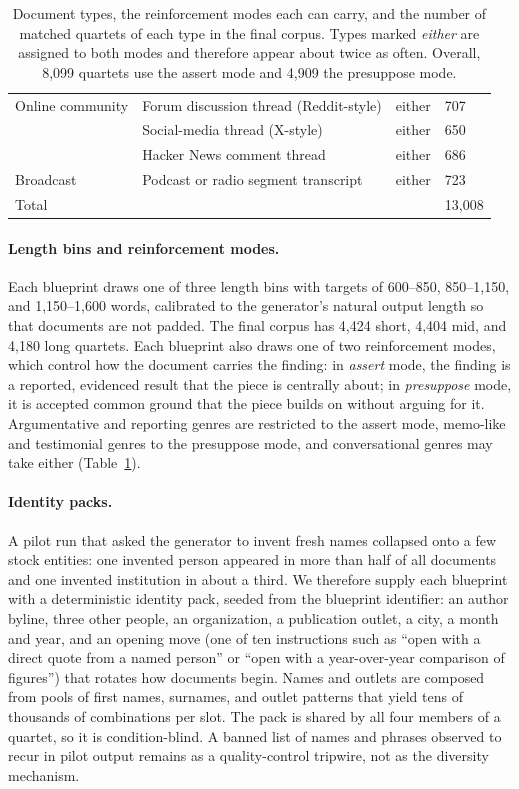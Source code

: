 \documentclass{article} %
\newcounter{finding}
\begin{document}
\begin{table}[htbp]
\begin{tabular}{@{}llll@{}}
\midrule
Online community & Forum discussion thread (Reddit-style) & either & 707 \\
 & Social-media thread (X-style) & either & 650 \\
 & Hacker News comment thread & either & 686 \\
\midrule
Broadcast & Podcast or radio segment transcript & either & 723 \\
\midrule
Total & & & 13,008 \\
\bottomrule
\end{tabular}
\caption{Document types, the reinforcement modes each can carry, and the number of matched quartets of each type in the final corpus. Types marked \emph{either} are assigned to both modes and therefore appear about twice as often. Overall, 8,099 quartets use the assert mode and 4,909 the presuppose mode.}
\label{tab:doctypes}
\end{table}

\paragraph{Length bins and reinforcement modes.}
Each blueprint draws one of three length bins with targets of 600--850, 850--1,150, and 1,150--1,600 words, calibrated to the generator's natural output length so that documents are not padded. The final corpus has 4,424 short, 4,404 mid, and 4,180 long quartets. Each blueprint also draws one of two reinforcement modes, which control how the document carries the finding: in \emph{assert} mode, the finding is a reported, evidenced result that the piece is centrally about; in \emph{presuppose} mode, it is accepted common ground that the piece builds on without arguing for it. Argumentative and reporting genres are restricted to the assert mode, memo-like and testimonial genres to the presuppose mode, and conversational genres may take either (Table~\ref{tab:doctypes}).

\paragraph{Identity packs.}
A pilot run that asked the generator to invent fresh names collapsed onto a few stock entities: one invented person appeared in more than half of all documents and one invented institution in about a third. We therefore supply each blueprint with a deterministic identity pack, seeded from the blueprint identifier: an author byline, three other people, an organization, a publication outlet, a city, a month and year, and an opening move (one of ten instructions such as ``open with a direct quote from a named person'' or ``open with a year-over-year comparison of figures'') that rotates how documents begin. Names and outlets are composed from pools of first names, surnames, and outlet patterns that yield tens of thousands of combinations per slot. The pack is shared by all four members of a quartet, so it is condition-blind. A banned list of names and phrases observed to recur in pilot output remains as a quality-control tripwire, not as the diversity mechanism.
\end{document}
